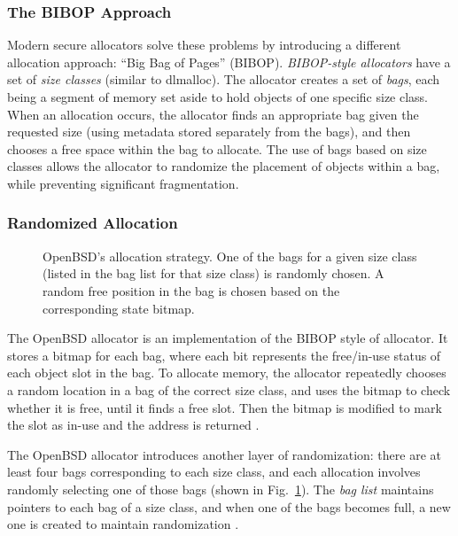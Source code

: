 \documentclass[conference]{IEEEtran}
\begin{document}
\subsubsection{The BIBOP Approach}

Modern secure allocators solve these problems by introducing a different allocation approach: ``Big Bag of Pages'' (BIBOP).
\emph{BIBOP-style allocators} have a set of \emph{size classes} (similar to dlmalloc).
The allocator creates a set of \emph{bags}, each being a segment of memory set aside to hold objects of one specific size class.
When an allocation occurs, the allocator finds an appropriate bag given the requested size (using metadata stored separately from the bags), and then chooses a free space within the bag to allocate.
The use of bags based on size classes allows the allocator to randomize the placement of objects within a bag, while preventing significant fragmentation.

\subsubsection{Randomized Allocation}

\begin{figure}
	\def\svgwidth{3.5in}
	
	\caption{
		OpenBSD's allocation strategy.
		One of the bags for a given size class (listed in the bag list for that size class) is randomly chosen.
		A random free position in the bag is chosen based on the corresponding state bitmap.
		\label{fig:openbsd_allocation}}
\end{figure}

The OpenBSD allocator is an implementation of the BIBOP style of allocator.
It stores a bitmap for each bag, where each bit represents the free/in-use status of each object slot in the bag.
To allocate memory, the allocator repeatedly chooses a random location in a bag of the correct size class, and uses the bitmap to check whether it is free, until it finds a free slot.
Then the bitmap is modified to mark the slot as in-use and the address is returned \cite{freeguard}.

The OpenBSD allocator introduces another layer of randomization: there are at least four bags corresponding to each size class, and each allocation involves randomly selecting one of those bags (shown in Fig.~\ref{fig:openbsd_allocation}).
The \emph{bag list} maintains pointers to each bag of a size class, and when one of the bags becomes full, a new one is created to maintain randomization \cite{freeguard}.
\end{document}
